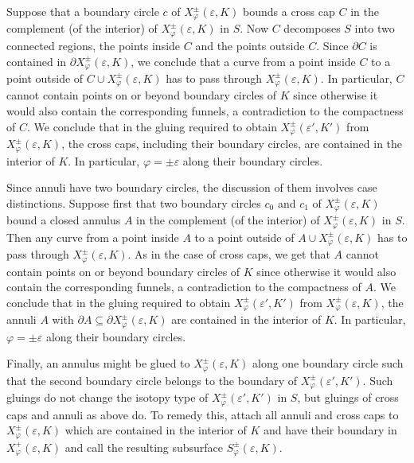 Suppose that a boundary circle $c$ of $X_{\varphi}^\pm({\varepsilon},K)$
bounds a cross cap $C$ in the complement (of the interior) of $X_{\varphi}^\pm({\varepsilon},K)$ in $S$.
Now $C$ decomposes $S$ into two connected regions,
the points inside $C$ and the points outside $C$.
Since $\partial C$ is contained in $\partial X_{\varphi}^\pm({\varepsilon},K)$,
we conclude that a curve from a point inside $C$ to a point outside
of $C\cup X_{\varphi}^\pm({\varepsilon},K)$ has to pass through $X_{\varphi}^\pm({\varepsilon},K)$.
In particular, $C$ cannot contain points on or beyond boundary circles of $K$
since otherwise it would also contain the corresponding funnels,
a contradiction to the compactness of $C$.
We conclude that in the gluing required to obtain $X_{\varphi}^\pm({\varepsilon}',K')$ from $X_{\varphi}^\pm({\varepsilon},K)$,
the cross caps, including their boundary circles,
are contained in the interior of $K$.
In particular, ${\varphi}=\pm{\varepsilon}$ along their boundary circles.

Since annuli have two boundary circles,
the discussion of them involves case distinctions.
Suppose first that two boundary circles $c_0$ and $c_1$ of $X_{\varphi}^\pm({\varepsilon},K)$
bound a closed annulus $A$
in the complement (of the interior) of $X_{\varphi}^\pm({\varepsilon},K)$ in $S$.
Then any curve from a point inside $A$ to a point outside
of $A\cup X_{\varphi}^\pm({\varepsilon},K)$ has to pass through $X_{\varphi}^\pm({\varepsilon},K)$.
As in the case of cross caps,
we get that $A$ cannot contain points on or beyond boundary circles of $K$
since otherwise it would also contain the corresponding funnels,
a contradiction to the compactness of $A$.
We conclude that
in the gluing required to obtain $X_{\varphi}^\pm({\varepsilon}',K')$ from $X_{\varphi}^\pm({\varepsilon},K)$,
the annuli $A$ with $\partial A\subseteq\partial X_{\varphi}^\pm({\varepsilon},K)$ 
are contained in the interior of $K$.
In particular, ${\varphi}=\pm{\varepsilon}$ along their boundary circles.

Finally, an annulus might be glued to $X_{\varphi}^\pm({\varepsilon},K)$ along one boundary circle
such that the second boundary circle belongs to the boundary of $X_{\varphi}^\pm({\varepsilon}',K')$.
Such gluings do not change the isotopy type of $X_{\varphi}^\pm({\varepsilon}',K')$ in $S$,
but gluings of cross caps and annuli as above do.
To remedy this, attach all annuli and cross caps to $X_{\varphi}^\pm({\varepsilon},K)$
which are contained in the interior of $K$ and have their boundary in $X_{\varphi}^+({\varepsilon},K)$
and call the resulting subsurface $S_{\varphi}^\pm({\varepsilon},K)$.

